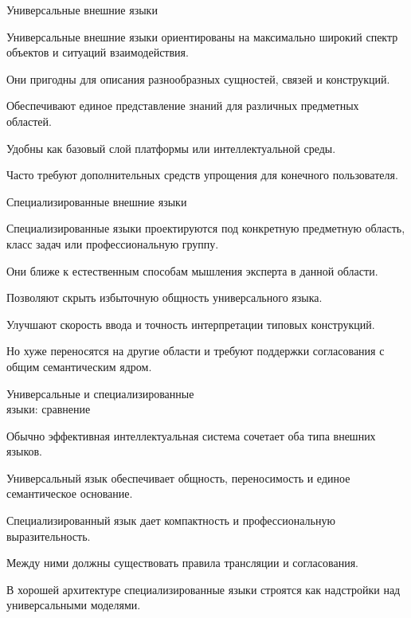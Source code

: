 \begin{frame}{Универсальные внешние языки}
	\topline
	\justifying

	Универсальные внешние языки ориентированы на максимально широкий спектр объектов и ситуаций взаимодействия.
	
	\begin{textitemize}
		\item Они пригодны для описания разнообразных сущностей, связей и конструкций.
		\item Обеспечивают единое представление знаний для различных предметных областей.
		\item Удобны как базовый слой платформы или интеллектуальной среды.
		\item Часто требуют дополнительных средств упрощения для конечного пользователя.
	\end{textitemize}
\end{frame}

\begin{frame}{Специализированные внешние языки}
	\topline
	\justifying

	Специализированные языки проектируются под конкретную предметную область, класс задач или профессиональную группу.
	
	\begin{textitemize}
		\item Они ближе к естественным способам мышления эксперта в данной области.
		\item Позволяют скрыть избыточную общность универсального языка.
		\item Улучшают скорость ввода и точность интерпретации типовых конструкций.
		\item Но хуже переносятся на другие области и требуют поддержки согласования с общим семантическим ядром.
	\end{textitemize}
\end{frame}

\begin{frame}{Универсальные и специализированные\\ языки: сравнение}
	\topline
	\justifying

	Обычно эффективная интеллектуальная система сочетает оба типа внешних языков.
	
	\begin{textitemize}
		\item Универсальный язык обеспечивает общность, переносимость и единое семантическое основание.
		\item Специализированный язык дает компактность и профессиональную выразительность.
		\item Между ними должны существовать правила трансляции и согласования.
		\item В хорошей архитектуре специализированные языки строятся как надстройки над универсальными моделями.
	\end{textitemize}
\end{frame}

